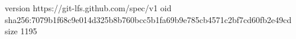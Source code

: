 version https://git-lfs.github.com/spec/v1
oid sha256:7079b1f68c9e014d325b8b760bcc5b1fa69b9e785cb4571c2bf7cd60fb2e49cd
size 1195
